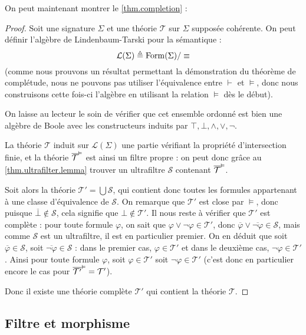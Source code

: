 On peut maintenant montrer le \cref{thm.completion} :

\begin{proof}
  Soit une signature $\Sigma$ et une théorie $\mathcal T$ sur $\Sigma$ supposée
  cohérente. On peut
  définir l'algèbre de Lindenbaum-Tarski pour la sémantique :
  \[\mathcal L(\Sigma) \triangleq \operatorname{Form}(\Sigma)/\equiv\]
  (comme nous prouvons un résultat permettant la démonstration du théorème de
  complétude, nous ne pouvons pas utiliser l'équivalence entre $\vdash$ et
  $\vDash$, donc nous construisons cette fois-ci l'algèbre en utilisant la
  relation $\vDash$ dès le début).

  On laisse au lecteur le soin de vérifier que cet ensemble ordonné est bien
  une algèbre de Boole avec les constructeurs induits par
  $\top, \bot, \land, \lor, \lnot$.

  La théorie $\mathcal T$ induit sur $\mathcal L(\Sigma)$ une partie vérifiant
  la propriété d'intersection finie, et la théorie $\overline{\mathcal T}^{\vDash}$ est
  ainsi un filtre propre : on peut donc grâce au \cref{thm.ultrafilter.lemma}
  trouver un ultrafiltre $\mathcal S$ contenant $\overline{\mathcal T}^{\vDash}$.

  Soit alors la théorie $\mathcal T' = \bigcup\mathcal S$, qui contient donc
  toutes les formules appartenant à une classe d'équivalence de $\mathcal S$.
  On remarque que $\mathcal T'$ est close par $\vDash$, donc puisque
  $\overline\bot \notin\mathcal S$, cela signifie que $\bot\notin\mathcal T'$.
  Il nous reste à vérifier que $\mathcal T'$ est complète : pour toute
  formule $\varphi$, on sait que $\varphi\lor\lnot\varphi \in \mathcal T'$, donc
  $\overline{\varphi}\lor\overline{\lnot\varphi}\in\mathcal S$, mais
  comme $\mathcal S$ est un ultrafiltre, il est en particulier premier. On
  en déduit que soit $\overline\varphi \in \mathcal S$, soit
  $\overline{\lnot\varphi}\in \mathcal S$ : dans le premier cas,
  $\varphi\in \mathcal T'$ et dans le deuxième cas,
  $\lnot\varphi\in \mathcal T'$. Ainsi pour toute formule $\varphi$, soit
  $\varphi\in \mathcal T'$ soit $\lnot\varphi\in \mathcal T'$ (c'est donc en
  particulier encore le cas pour $\overline{\mathcal T'}^{\vDash} = \mathcal T'$).

  Donc il existe une théorie complète $\mathcal T'$ qui contient la théorie
  $\mathcal T$.
\end{proof}

\subsection{Filtre et morphisme}

